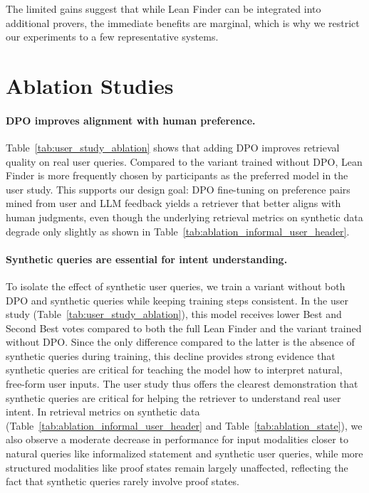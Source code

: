 \documentclass{article} %
\begin{document}
The limited gains suggest that while Lean Finder can be integrated into additional provers, the immediate benefits are marginal, which is why we restrict our experiments to a few representative systems.



\section{Ablation Studies}
\label{ablation_study}

\paragraph{DPO improves alignment with human preference.}
Table~\ref{tab:user_study_ablation} shows that adding DPO improves retrieval quality on real user queries. Compared to the variant trained without DPO, Lean Finder is more frequently chosen by participants as the preferred model in the user study. This supports our design goal: DPO fine-tuning on preference pairs mined from user and LLM feedback yields a retriever that better aligns with human judgments, even though the underlying retrieval metrics on synthetic data degrade only slightly as shown in Table~\ref{tab:ablation_informal_user_header}.

\paragraph{Synthetic queries are essential for intent understanding.}
To isolate the effect of synthetic user queries, we train a variant without both DPO and synthetic queries while keeping training steps consistent. In the user study (Table~\ref{tab:user_study_ablation}), this model receives lower Best and Second Best votes compared to both the full Lean Finder and the variant trained without DPO. Since the only difference compared to the latter is the absence of synthetic queries during training, this decline provides strong evidence that synthetic queries are critical for teaching the model how to interpret natural, free-form user inputs. The user study thus offers the clearest demonstration that synthetic queries are critical for helping the retriever to understand real user intent. In retrieval metrics on synthetic data (Table~\ref{tab:ablation_informal_user_header} and Table~\ref{tab:ablation_state}), we also observe a moderate decrease in performance for input modalities closer to natural queries like informalized statement and synthetic user queries, while more structured modalities like proof states remain largely unaffected, reflecting the fact that synthetic queries rarely involve proof states.
\end{document}
